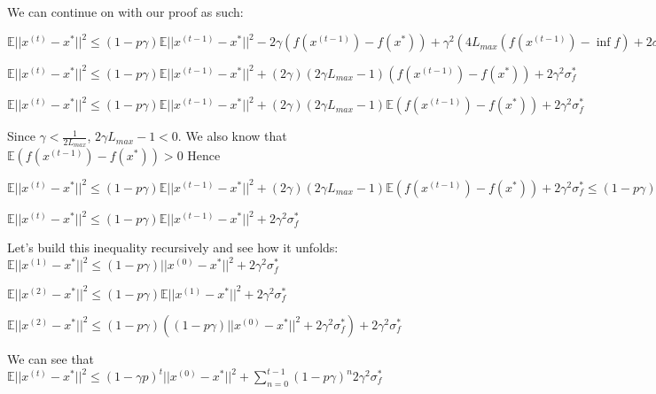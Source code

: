We can continue on with our proof as such: \newline 

$\mathbb{E}||x^{(t)} - x^*||^2  \leq (1 - p \gamma) \mathbb{E}||x^{(t - 1)} - x^*||^2 - 2\gamma(f(x^{(t - 1)}) - f(x^*)) + \gamma^2 (4L_{max} (f(x^{(t - 1)}) - \inf f) + 2 \sigma_f^*)$ \newline 

$\mathbb{E}||x^{(t)} - x^*||^2  \leq (1 - p \gamma) \mathbb{E}||x^{(t - 1)} - x^*||^2 + (2 \gamma) (2 \gamma L_{max} - 1)(f(x^{(t - 1)}) - f(x^*)) + 2\gamma^2 \sigma_f^*$ \newline 

$\mathbb{E}||x^{(t)} - x^*||^2  \leq (1 - p \gamma) \mathbb{E}||x^{(t - 1)} - x^*||^2 + (2 \gamma) (2 \gamma L_{max} - 1) \mathbb{E}(f(x^{(t - 1)}) - f(x^*)) + 2\gamma^2 \sigma_f^*$ \newline 

Since $\gamma < \frac{1}{2L_{max}}$, $2\gamma L_{max} - 1 < 0$. We also know that $\mathbb{E}(f(x^{(t - 1)}) - f(x^*)) > 0$ Hence \newline 

$\mathbb{E}||x^{(t)} - x^*||^2  \leq (1 - p \gamma) \mathbb{E}||x^{(t - 1)} - x^*||^2 + (2 \gamma) (2 \gamma L_{max} - 1) \mathbb{E}(f(x^{(t - 1)}) - f(x^*)) + 2\gamma^2 \sigma_f^* \leq (1 - p \gamma) \mathbb{E}||x^{(t - 1)} - x^*||^2 + 2\gamma^2 \sigma_f^*$ \newline 


$\mathbb{E}||x^{(t)} - x^*||^2  \leq (1 - p \gamma) \mathbb{E}||x^{(t - 1)} - x^*||^2 + 2\gamma^2 \sigma_f^*$ \newline 

Let's build this inequality recursively and see how it unfolds: \newline 
$\mathbb{E}||x^{(1)} - x^*||^2  \leq (1 - p \gamma) ||x^{(0)} - x^*||^2 + 2\gamma^2 \sigma_f^*$ \newline 

$\mathbb{E}||x^{(2)} - x^*||^2  \leq (1 - p \gamma) \mathbb{E}||x^{(1)} - x^*||^2 + 2\gamma^2 \sigma_f^*$ \newline 

$\mathbb{E}||x^{(2)} - x^*||^2  \leq (1 - p \gamma) ((1 - p \gamma) ||x^{(0)} - x^*||^2 + 2\gamma^2 \sigma_f^*) + 2\gamma^2 \sigma_f^*$ \newline 


We can see that $\mathbb{E}||x^{(t)} - x^*||^2 \leq (1 - \gamma p)^t ||x^{(0)} - x^*||^2 + \sum_{n=0}^{t - 1} (1 - p\gamma)^n 2\gamma^2 \sigma_f^*$

